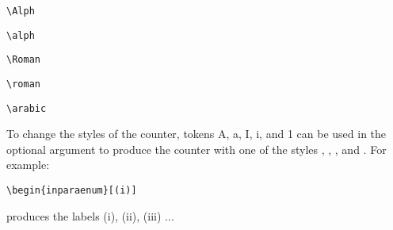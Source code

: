 \begin{lstlisting}
\Alph
\end{lstlisting}
\begin{lstlisting}
\alph
\end{lstlisting}
\begin{lstlisting}
\Roman
\end{lstlisting}
\begin{lstlisting}
\roman
\end{lstlisting}
\begin{lstlisting}
\arabic
\end{lstlisting}

To change the styles of the counter, tokens A, a, I, i, and 1 can be used in
the optional argument to produce the counter with one of the styles , , ,  and
. For example:
\begin{lstlisting}
\begin{inparaenum}[(i)]
\end{lstlisting}
 
produces the labels (i), (ii), (iii) ...
